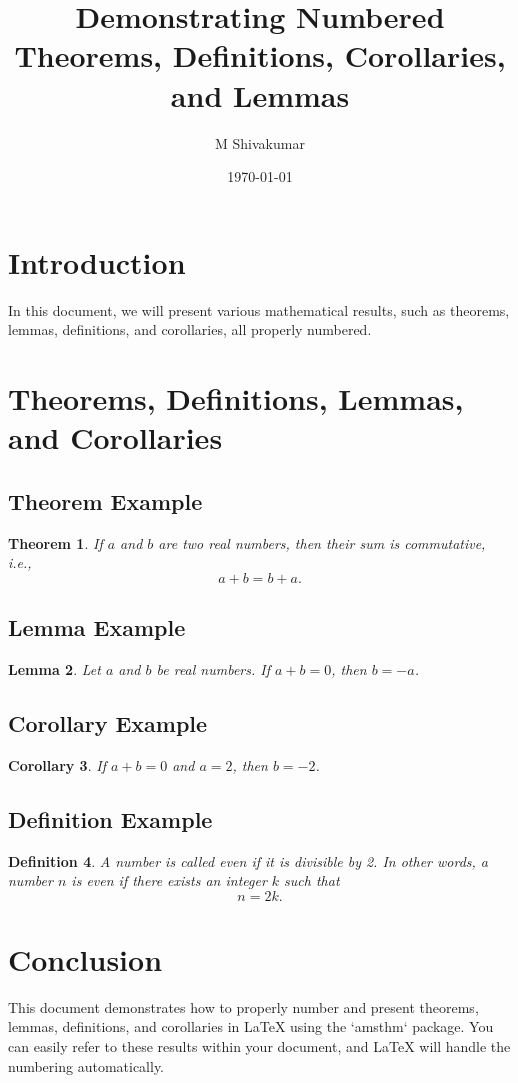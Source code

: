 \documentclass[a4paper,12pt]{article}
\newtheorem{theorem}{Theorem}[section] %
\newtheorem{lemma}[theorem]{Lemma} %
\newtheorem{corollary}[theorem]{Corollary} %
\newtheorem{definition}[theorem]{Definition} %
\begin{document}
 
\title{Demonstrating Numbered Theorems, Definitions, Corollaries, and Lemmas} 
\author{M Shivakumar} %
\date{\today} 
\maketitle 
\section*{Introduction} In this document, we will present various mathematical results, such as 
theorems, lemmas, definitions, and corollaries, all properly numbered. 
\section{Theorems, Definitions, Lemmas, and Corollaries}  
\subsection*{Theorem Example} \begin{theorem} 
If \( a \) and \( b \) are two real numbers, then their sum is commutative, i.e.,  
\[ a + b = b + a. \] 
\end{theorem}  
\subsection*{Lemma Example}  
\begin{lemma}  
Let \( a \) and \( b \) be real numbers. If \( a + b = 0 \), then \( b = -a \).  
\end{lemma} 
\subsection*{Corollary Example}  
\begin{corollary} 
If \( a + b = 0 \) and \( a = 2 \), then \( b = -2 \).  
\end{corollary} 
\subsection*{Definition Example} 
\begin{definition}  
A number is called \textit{even} if it is divisible by 2. In other words, a number \( n \) is even if 
there exists an integer \( k \) such that  
\[ 
n = 2k. 
\]  
\end{definition}  
\section{Conclusion}  
This document demonstrates how to properly number and present theorems, lemmas, 
definitions, and corollaries in LaTeX using the `amsthm` package. You can easily refer to these 
results within your document, and LaTeX will handle the numbering automatically. 
\end{document}
